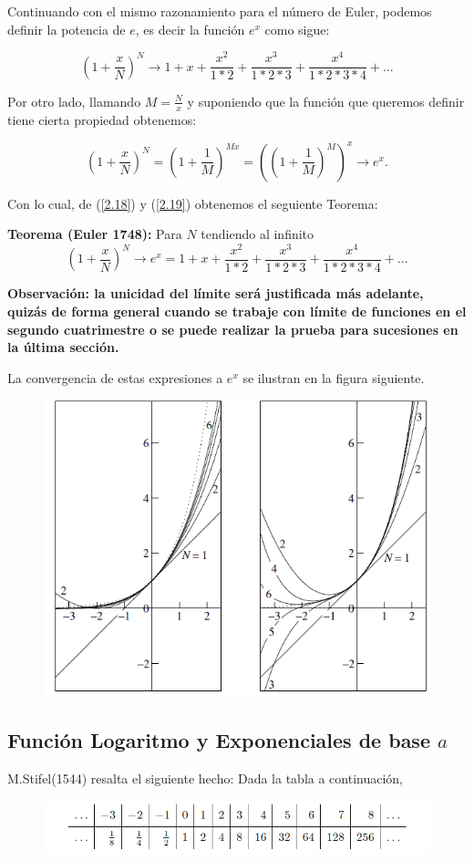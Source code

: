 \documentclass[a4paper,10pt,BCOR10mm,oneside,headsepline]{scrbook}
\begin{document}
Continuando con el mismo razonamiento para el número de Euler, podemos definir la potencia de $e$, es decir la función $e^x$ como sigue:

\begin{equation}
\label{2.18}
(1+\frac{x}{N})^N \rightarrow 1+x+\frac{x^2}{1*2}+\frac{x^3}{1*2*3}+\frac{x^4}{1*2*3*4}+...
\end{equation}

Por otro lado, llamando $M=\frac{N}{x}$ y suponiendo que la función que queremos definir tiene cierta propiedad obtenemos:

\begin{equation}
\label{2.19}
(1+\frac{x}{N})^N=(1+\frac{1}{M})^{Mx}=((1+\frac{1}{M})^M)^x \rightarrow e^x.
\end{equation}

Con lo cual, de (\ref{2.18}) y (\ref{2.19}) obtenemos el seguiente Teorema:

\textbf{Teorema (Euler 1748):} Para $N$ tendiendo al infinito  
$$(1+\frac{x}{N})^N \rightarrow e^x=1+x+\frac{x^2}{1*2}+\frac{x^3}{1*2*3}+\frac{x^4}{1*2*3*4}+...$$

\textbf{Observación: la unicidad del límite será justificada más adelante, quizás de forma general cuando se trabaje con límite de funciones en el segundo cuatrimestre o se puede realizar la prueba para sucesiones en la última sección.}

La convergencia de estas expresiones a $e^x$ se ilustran en la figura siguiente. 

\begin{figure}[h!]
\centering
    \includegraphics[width=0.4\linewidth]{exp1.png}
  \label{fig:exp}
\end{figure}


\newpage
\subsection{Función Logaritmo y Exponenciales de base $a$} 

M.Stifel(1544) resalta el siguiente hecho:
Dada la tabla a continuación,
\begin{figure}[h!]
\centering
    \includegraphics[width=0.8\linewidth]{log1.png}
  \label{fig:log}
\end{figure}
\end{document}
